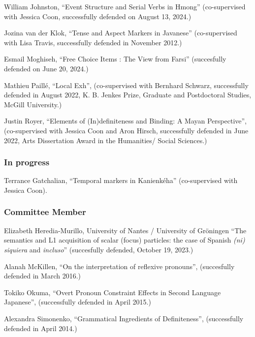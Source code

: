 \documentclass[11pt]{article}
\begin{document}
William Johnston, ``Event Structure and Serial Verbs in Hmong'' (co-supervised with Jessica Coon, successfully defended on August 13, 2024.)

Jozina van der Klok, ``Tense and Aspect Markers in Javanese'' (co-supervised with Lisa Travis, successfully defended in November
2012.)
 
Esmail Moghiseh, ``Free Choice Items : The View from Farsi'' (succesfully defended on June 20, 2024.)

Mathieu Paill\'e, ``Local Exh'', (co-supervised with Bernhard Schwarz, successfully defended in August 2022, K. B. Jenkes Prize, Graduate and Postdoctoral Studies, McGill University.)

Justin Royer, ``Elements of (In)definiteness and Binding: A Mayan Perspective'', (co-supervised with Jessica Coon and Aron Hirsch, successfully defended in June
2022, Arts Dissertation Award in the Humanities/ Social Sciences.)

\vspace{-10pt}

\subsubsection*{In progress}

Terrance Gatchalian, ``Temporal markers in Kanienk\'eha'' (co-supervised with Jessica Coon).

\vspace{-10pt}

\subsubsection*{Committee Member}

Elizabeth Heredia-Murillo, University of Nantes / University of Gr\"{o}ningen ``The semantics and L1 acquisition of scalar (focus) particles: the case of Spanish \textit{(ni) siquiera} and \textit{incluso}'' (succesfully defended, October 19, 2023.)

Alanah McKillen, ``On the interpretation of reflexive pronouns'', (succesfully defended in March 2016.)

Tokiko Okuma, ``Overt Pronoun Constraint Effects in Second Language Japanese'', (successfully defended in April 2015.)

Alexandra Simonenko, ``Grammatical Ingredients of Definiteness'',
(successfully defended in April 2014.)
\vspace{-10pt}
\end{document}
